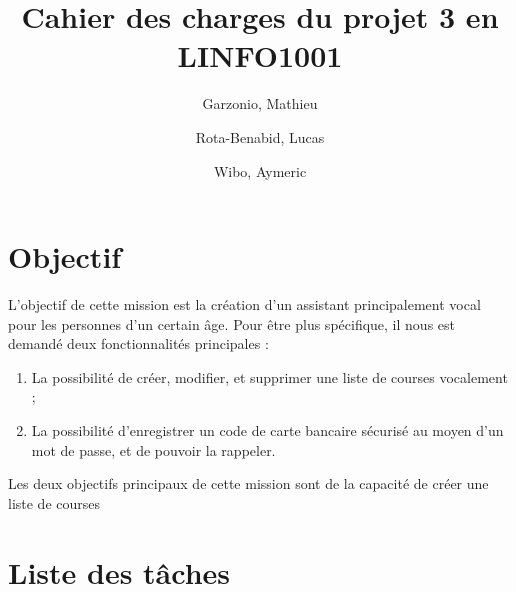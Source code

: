 \documentclass{article}
\title{Cahier des charges du projet 3 en LINFO1001}
\author{
	Garzonio, Mathieu
	\and
	Rota-Benabid, Lucas
	\and
	Wibo, Aymeric
}
\begin{document}
\maketitle

\section{Objectif}

L'objectif de cette mission est la création d'un assistant principalement vocal pour les personnes d'un certain âge. Pour être plus spécifique, il nous est demandé deux fonctionnalités principales :

\begin{enumerate}

	\item{La possibilité de créer, modifier, et supprimer une liste de courses vocalement ;}
	\item{La possibilité d'enregistrer un code de carte bancaire sécurisé au moyen d'un mot de passe, et de pouvoir la rappeler.}

\end{enumerate}

Les deux objectifs principaux de cette mission sont de la capacité de créer une liste de courses 

\section{Liste des tâches}

\section{}
\end{document}
